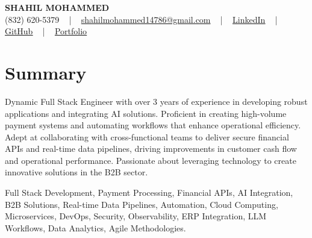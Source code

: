 \documentclass[letterpaper,10pt]{article}
\begin{document}
\begin{center}
    {\fontsize{14pt}{12pt}\selectfont \textbf{\MakeUppercase{Shahil Mohammed}}}\\ \vspace{2pt}
    \fontsize{10pt}{12pt}\selectfont (832) 620-5379 ~ | ~ \href{mailto:shahilmohammed14786@gmail.com}{shahilmohammed14786@gmail.com} ~ | ~  
    \href{https://www.linkedin.com/in/shahil-mohammed-9652931a1/}{\color{blue}\underline{LinkedIn}}  ~ | ~ 
    \href{https://github.com/freakbeast14}{\color{blue}\underline{GitHub}} ~ | ~ 
    \href{https://shahil-mohammed.netlify.app/}{\color{blue}\underline{Portfolio}}
    \vspace{-8pt}
\end{center}

\section{Summary}
\vspace{-2pt}\fontsize{8pt}{9pt}\selectfont
Dynamic Full Stack Engineer with over 3 years of experience in developing robust applications and integrating AI solutions. Proficient in creating high-volume payment systems and automating workflows that enhance operational efficiency. Adept at collaborating with cross-functional teams to deliver secure financial APIs and real-time data pipelines, driving improvements in customer cash flow and operational performance. Passionate about leveraging technology to create innovative solutions in the B2B sector.
 \vspace{-5pt}
 
{\fontsize{1pt}{1pt}\selectfont\color{white}
Full Stack Development, Payment Processing, Financial APIs, AI Integration, B2B Solutions, Real-time Data Pipelines, Automation, Cloud Computing, Microservices, DevOps, Security, Observability, ERP Integration, LLM Workflows, Data Analytics, Agile Methodologies.
}
\vspace{-8pt}

\vspace{-2pt}
\end{document}
